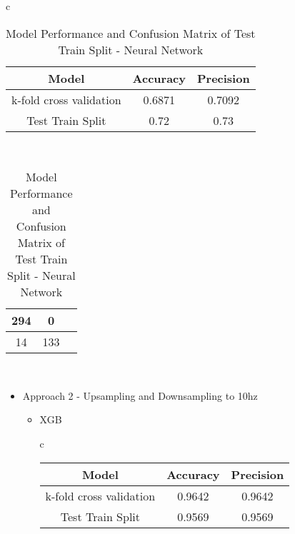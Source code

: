\documentclass{article}
\begin{document}
\begin{itemize}
\begin{itemize}
            \begin{table}[H]
            \centering
            \begin{tabular}{c} %
                \begin{tabular}{|c|c|c|}
                \hline
                Model & Accuracy & Precision \\
                \hline
                k-fold cross validation & 0.6871 & 0.7092 \\
                \hline
                Test Train Split & 0.72 & 0.73 \\
                \hline
                \end{tabular}
                \vspace{5mm} \\ %

                
                \begin{tabular}{|c|c|c|}
                \hline
                294 & 0 \\
                \hline
                14 & 133 \\
                \hline
                \end{tabular} \\
            \end{tabular}
            \caption{Model Performance and Confusion Matrix of Test Train Split - Neural Network}
            \label{tab:combined_table}
            \end{table}
\end{itemize}

\clearpage





\begin{itemize}
    \item Approach 2 - Upsampling and Downsampling to 10hz
\begin{itemize}
        \item XGB
            \begin{table}[htbp]
            \centering
            \begin{tabular}{c} %
                \begin{tabular}{|c|c|c|}
                \hline
                Model & Accuracy & Precision \\
                \hline
                k-fold cross validation & 0.9642 & 0.9642 \\
                \hline
                Test Train Split & 0.9569 & 0.9569 \\
                \hline
                \end{tabular}
                \vspace{5mm} \\ %
                

\end{tabular}
\end{table}
\end{itemize}
\end{itemize}
\end{itemize}
\end{document}
